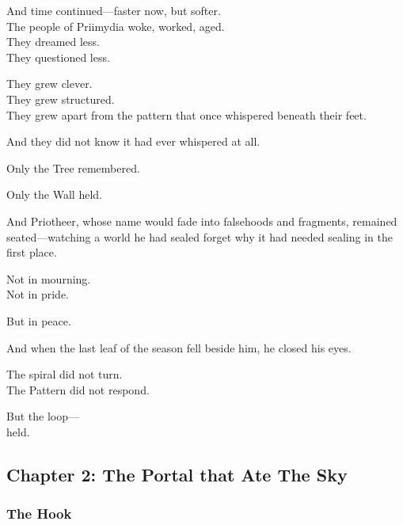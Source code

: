 \documentclass[12pt]{article}
\begin{document}
\vspace{0.5em}
And time continued---faster now, but softer.\\
The people of Priimydia woke, worked, aged.\\
They dreamed less.\\
They questioned less.

\vspace{0.5em}
They grew clever.\\
They grew structured.\\
They grew apart from the pattern that once whispered beneath their feet.

\vspace{0.5em}
And they did not know it had ever whispered at all.

\vspace{0.5em}
Only the Tree remembered.

\vspace{0.5em}
Only the Wall held.

\vspace{0.5em}
And Priotheer, whose name would fade into falsehoods and fragments, remained seated---watching a world he had sealed forget why it had needed sealing in the first place.

\vspace{0.5em}
Not in mourning.\\
Not in pride.

\vspace{0.5em}
But in peace.

\vspace{0.5em}
And when the last leaf of the season fell beside him, he closed his eyes.

\vspace{0.5em}
The spiral did not turn.\\
The Pattern did not respond.

\vspace{0.5em}
But the loop---\\
held.

\newpage

\subsection{Chapter 2: The Portal that Ate The Sky}

\vspace{.5in}

\subsubsection{The Hook}
\end{document}
